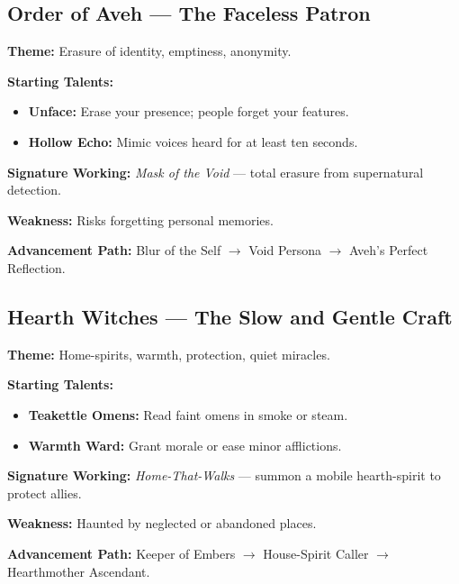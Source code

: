 \documentclass[11pt]{book}
\begin{document}
\subsection*{Order of Aveh --- The Faceless Patron}
\begin{tcolorbox}[colback=mistgray!10, colframe=bloodrust, title={The Nameless Vessel}]
\textbf{Theme:} Erasure of identity, emptiness, anonymity.

\textbf{Starting Talents:}
\begin{itemize}[noitemsep]
    \item \textbf{Unface:} Erase your presence; people forget your features.
    \item \textbf{Hollow Echo:} Mimic voices heard for at least ten seconds.
\end{itemize}

\textbf{Signature Working:} \emph{Mask of the Void} --- total erasure from 
supernatural detection.

\textbf{Weakness:} Risks forgetting personal memories.

\textbf{Advancement Path:} Blur of the Self $\rightarrow$ Void Persona 
$\rightarrow$ Aveh's Perfect Reflection.
\end{tcolorbox}

\subsection*{Hearth Witches --- The Slow and Gentle Craft}
\begin{tcolorbox}[colback=mistgray!10, colframe=lanternamber, title={The Ember-Tender}]
\textbf{Theme:} Home-spirits, warmth, protection, quiet miracles.

\textbf{Starting Talents:}
\begin{itemize}[noitemsep]
    \item \textbf{Teakettle Omens:} Read faint omens in smoke or steam.
    \item \textbf{Warmth Ward:} Grant morale or ease minor afflictions.
\end{itemize}

\textbf{Signature Working:} \emph{Home-That-Walks} --- summon a mobile hearth-spirit 
to protect allies.

\textbf{Weakness:} Haunted by neglected or abandoned places.

\textbf{Advancement Path:} Keeper of Embers $\rightarrow$ House-Spirit Caller 
$\rightarrow$ Hearthmother Ascendant.
\end{tcolorbox}
\end{document}
